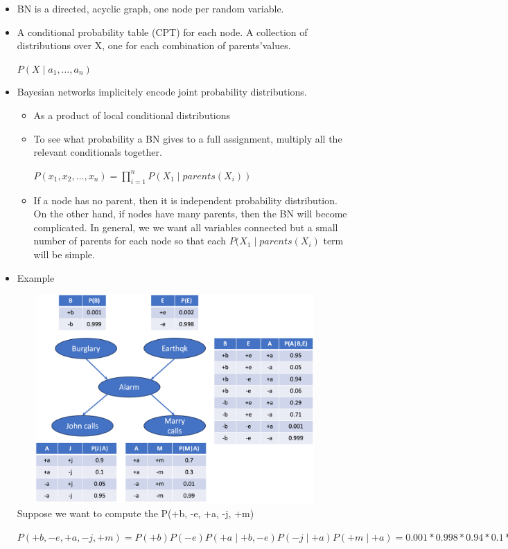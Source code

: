\documentclass[11pt,a4paper]{report}
\begin{document}
\begin{itemize}
    \item BN is a directed, acyclic graph, one node per random variable.
    \item A conditional probability table (CPT) for each node. A collection of distributions over X, one for each combination of parents'values.
    \begin{center}
        $P(X \mid a_{1}, \ldots, a_{n})$
    \end{center}
    \item Bayesian networks implicitely encode joint probability distributions.
    \begin{itemize}
        \item As a product of local conditional distributions
        \item To see what probability a BN gives to a full assignment, multiply all the relevant conditionals together.
        \begin{center}
            $P(x_{1}, x_{2}, \ldots, x_{n}) = \prod_{i=1}^{n}P(X_{1} \mid parents(X_{i}))$
        \end{center}
        \item If a node has no parent, then it is independent probability distribution. On the other hand, if nodes have many parents,  then the BN will become complicated. In general, we we want all variables connected but a small number of parents for each node so that each $P(X_{1} \mid parents(X_{i})$ term will be simple.
    \end{itemize}
    \item Example
    
    \includegraphics[width = 12cm, height=8cm]{alarm_eg.png}\\
    
    Suppose we want to compute the P(+b, -e, +a, -j, +m)
    \begin{center}
        $P(+b, -e, +a, -j, +m) = P(+b)P(-e)P(+a \mid +b, -e)P(-j \mid +a)P(+m \mid +a) = 0.001 * 0.998 * 0.94 * 0.1 * 0.7$
    \end{center}
\end{itemize}
\end{document}
